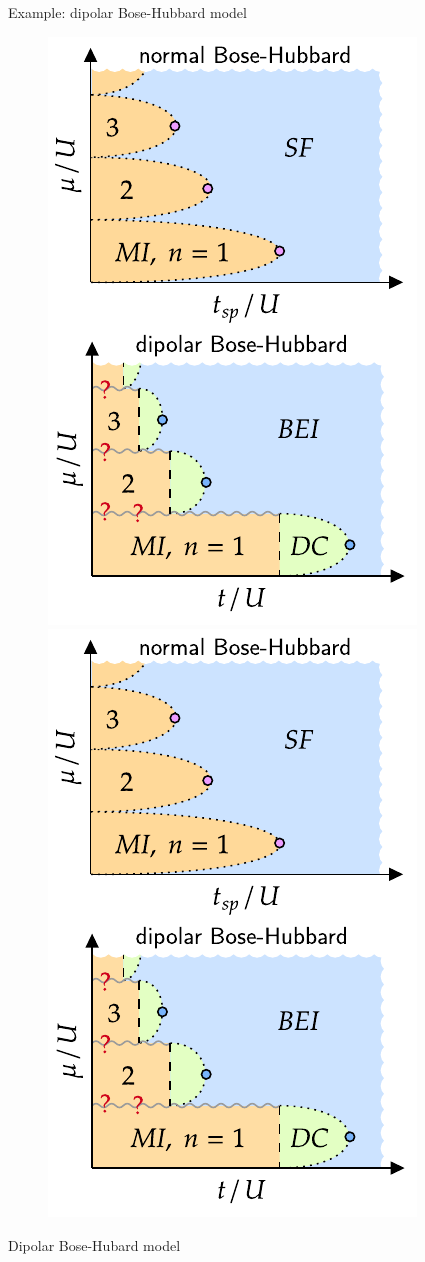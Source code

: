 \documentclass{beamer}
\begin{document}
\begin{frame}[t]{Example: dipolar Bose-Hubbard model}
\begin{figure}
	\centering
	\includegraphics[scale=.8]{bhm}
	\includegraphics[scale=.8]{dbhm}
\end{figure}
Dipolar Bose-Hubard model


\end{frame}
\end{document}

